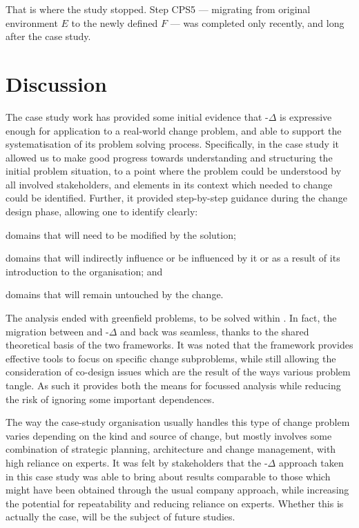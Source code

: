 \documentclass[runningheads,a4paper]{llncs}
\begin{document}
That is where the study stopped. Step CPS5 --- migrating from original environment $E$ to the newly defined $F$ --- was completed only recently, and long after the case study.

\section{Discussion}\label{sect:Discussion}

The case study work has provided some initial evidence that \POE{}-$\Delta$ is expressive enough for application to a real-world change problem, and able to support the systematisation of its problem solving process. Specifically, in the case study it allowed us to make good progress towards understanding and structuring the initial problem situation, to a point where the problem could be understood by all involved stakeholders, and elements in its context which needed to change could be identified. Further, it provided step-by-step guidance during the change design phase, allowing one to identify clearly: 
%
\begin{enumerate*}[label=(\roman*)]
\item domains that will need to be modified by the solution; 
\item domains that will indirectly influence or be influenced by it or as a result of its introduction to the organisation; and 
\item domains that will remain untouched by the change. 	
\end{enumerate*}

The analysis ended with greenfield problems, to be solved within \POE{}. In fact, the migration between \POE{} and \POE{}-$\Delta$ and back was seamless, thanks to the shared theoretical basis of the two frameworks. It was noted that the framework provides effective tools to focus on specific change subproblems, while still allowing the consideration of co-design issues which are the result of the ways various problem tangle. As such it provides both the means for focussed analysis while reducing the risk of ignoring some important dependences. 

The way the case-study organisation usually handles this type of change problem varies depending on the kind and source of change, but mostly involves some combination of strategic planning, architecture and change management, with high reliance on experts. It was felt by stakeholders that the \POE{}-$\Delta$ approach taken in this case study was able to bring about results comparable to those which might have been obtained through the usual company approach, while increasing the potential for repeatability and reducing reliance on experts. Whether this is actually the case, will be the subject of future studies.
\end{document}
